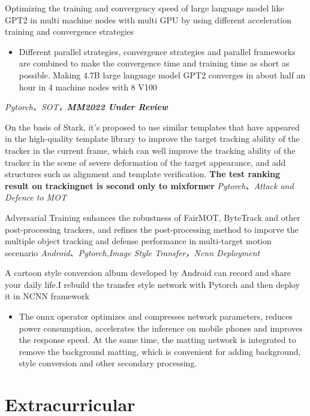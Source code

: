 \documentclass{uniquecv}
\begin{document}
Optimizing the training and convergency speed of large language model like GPT2 in multi machine nodes with multi GPU by using different acceleration training and convergence strategies
\begin{itemize}
  \item Different parallel strategies, convergence strategies and parallel frameworks are combined to make the convergence time and training time as short as possible. Making 4.7B large language model GPT2 converges in about half an hour in 4 machine nodes with 8 V100
\end{itemize}
\textit{Pytorch、SOT，\textbf{MM2022 Under Review}}
\vspace{0.4ex}

On the basis of Stark, it's proposed to use similar templates that have appeared in the high-quality template library to improve the target tracking ability of the tracker in the current frame, which can well improve the tracking ability of the tracker in the scene of severe deformation of the target appearance, and add structures such as alignment and template verification. \textbf{The test ranking result on trackingnet is second only to mixformer}
\textit{Pytorch、Attack and Defence to MOT}
\vspace{0.4ex}

Adversarial Training enhances the robustness of FairMOT, ByteTrack and other post-processing trackers, and refines the post-processing method to imporve the multiple object tracking and defense performance in multi-target motion secenario
\textit{Android、Pytorch,Image Style Transfer，Ncnn Deployment}
\vspace{0.4ex}

A cartoon style conversion album developed by Android can record and share your daily life.I rebuild the transfer style network with Pytorch and then deploy it in NCNN 
framework 
\begin{itemize}
  \item The onnx operator optimizes and compresses network parameters, reduces power consumption, accelerates the inference on mobile phones and improves the response speed. At the same time, the matting network is integrated to remove the background matting, which is convenient for adding background, style conversion and other secondary processing.
\end{itemize}
\section{Extracurricular}
\end{document}
